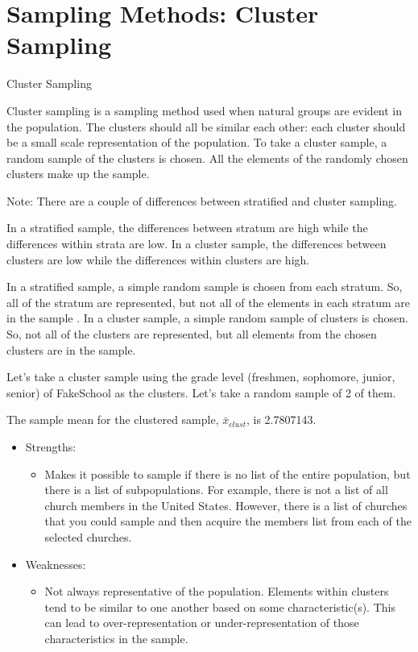 \documentclass[]{book}
\providecommand{\tightlist}{%
  \setlength{\itemsep}{0pt}\setlength{\parskip}{0pt}}
\begin{document}
\hypertarget{sampling-methods-cluster-sampling}{%
\section{Sampling Methods: Cluster Sampling}\label{sampling-methods-cluster-sampling}}

Cluster Sampling

Cluster sampling is a sampling method used when natural groups are evident in the population. The clusters should all be similar each other: each cluster should be a small scale representation of the population. To take a cluster sample, a random sample of the clusters is chosen. All the elements of the randomly chosen clusters make up the sample.

Note: There are a couple of differences between stratified and cluster sampling.

In a stratified sample, the differences between stratum are high while the differences within strata are low. In a cluster sample, the differences between clusters are low while the differences within clusters are high.

In a stratified sample, a simple random sample is chosen from each stratum. So, all of the stratum are represented, but not all of the elements in each stratum are in the sample . In a cluster sample, a simple random sample of clusters is chosen. So, not all of the clusters are represented, but all elements from the chosen clusters are in the sample.

Let's take a cluster sample using the grade level (freshmen, sophomore, junior, senior) of FakeSchool as the clusters. Let's take a random sample of 2 of them.

The sample mean for the clustered sample, {\(\bar{x}_{clust}\)}, is 2.7807143.

\begin{itemize}
\tightlist
\item
  Strengths:

  \begin{itemize}
  \tightlist
  \item
    Makes it possible to sample if there is no list of the entire population, but there is a list of subpopulations. For example, there is not a list of all church members in the United States. However, there is a list of churches that you could sample and then acquire the members list from each of the selected churches.
  \end{itemize}
\item
  Weaknesses:

  \begin{itemize}
  \tightlist
  \item
    Not always representative of the population. Elements within clusters tend to be similar to one another based on some characteristic(s). This can lead to over-representation or under-representation of those characteristics in the sample.
  \end{itemize}
\end{itemize}
\end{document}

